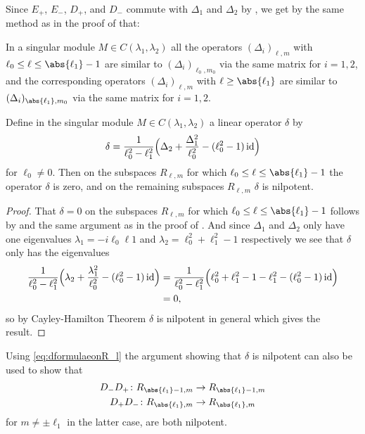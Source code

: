 Since $E_+$, $E_-$, $D_+$, and $D_-$ commute with $\Delta_1$ and $\Delta_2$ by , we get by the same method as in the proof of  that:

\begin{lemma}\label{lem:singmodDeltasimilar}
  In a singular module $M\in C(\lambda_1,\lambda_2)$ all the operators $(\Delta_i)_{\ell,m}$ with $\ell_0\leq \ell\leq \abs{\ell_1}-1$ are similar to $(\Delta_i)_{\ell_0,m_0}$ via the same matrix for $i=1,2$, and the corresponding operators $(\Delta_i)_{\ell,m}$ with $\ell\geq \abs{\ell_1}$ are similar to $(\Delta_i)_{\abs{\ell_1},m_0}$ via the same matrix for $i=1,2$.
\end{lemma}

\begin{lemma}\label{lem:Deltarelsing}
  Define in the singular module $M\in C(\lambda_1,\lambda_2)$ a linear operator $\delta$ by
  \begin{align}
    \delta = \dfrac{1}{\ell_0^2-\ell_1^2}\Bigl( \Delta_2 + \dfrac{\Delta_1^2}{\ell_0^2} - (\ell_0^2-1)\operatorname{id} \Bigr)
  \end{align}
  for $\ell_0\neq 0$. Then on the subspaces $R_{\ell,m}$ for which $\ell_0\leq \ell\leq \abs{\ell_1}-1$ the operator $\delta$ is zero, and on the remaining subspaces $R_{\ell,m}$ $\delta$ is nilpotent.
\end{lemma}
\begin{proof}
  That $\delta=0$ on the subspaces $R_{\ell,m}$ for which $\ell_0\leq \ell\leq \abs{\ell_1}-1$ follows by  and the same argument as in the proof of . And since $\Delta_1$ and $\Delta_2$ only have one eigenvalues $\lambda_1=-i\ell_0\ell1$ and $\lambda_2=\ell_0^2+\ell_1^2-1$ respectively we see that $\delta$ only has the eigenvalues
  \begin{align*}
    \dfrac{1}{\ell_0^2-\ell_1^2}\Bigl( \lambda_2 + \dfrac{\lambda_1^2}{\ell_0^2} - (\ell_0^2-1)\operatorname{id} \Bigr) &=\dfrac{1}{\ell_0^2-\ell_1^2}\Bigl( \ell_0^2+\ell_1^2-1 - \ell_1^2 - (\ell_0^2-1)\operatorname{id} \Bigr) \\
    &=0,
  \end{align*}
  so by Cayley-Hamilton Theorem $\delta$ is nilpotent in general which gives the result.
\end{proof}

\begin{remark}\label{rem:D+D-nilpotent}
  Using \cref{eq:dformulaeonR_l} the argument showing that $\delta$ is nilpotent can also be used to show that
  \begin{align*}
    D_-D_+\colon R_{\abs{\ell_1}-1,m} &\to R_{\abs{\ell_1}-1,m} \\
    D_+D_-\colon R_{\abs{\ell_1},m} &\to R_{\abs{\ell_1},m}
  \end{align*}
  for $m\neq \pm \ell_1$ in the latter case, are both nilpotent.
\end{remark}


